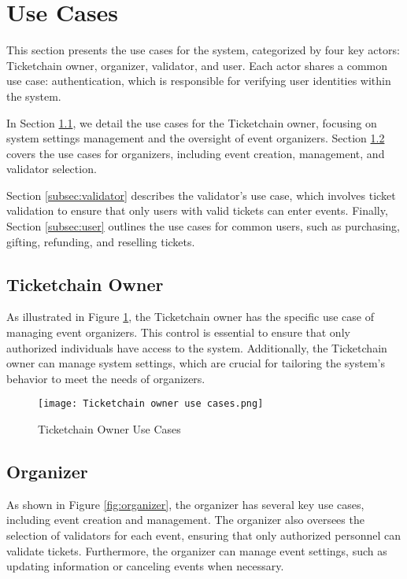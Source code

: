 \section{Use Cases}
\label{sec:use_cases}

This section presents the use cases for the system, categorized by four key
actors: Ticketchain owner, organizer, validator, and user. Each actor shares a
common use case: authentication, which is responsible for verifying user
identities within the system.

In Section \ref{subsec:ticketchain_owner}, we detail the use cases for the
Ticketchain owner, focusing on system settings management and the oversight of
event organizers. Section \ref{subsec:organizer} covers the use cases for
organizers, including event creation, management, and validator selection.

Section \ref{subsec:validator} describes the validator's use case, which
involves ticket validation to ensure that only users with valid tickets can
enter events. Finally, Section \ref{subsec:user} outlines the use cases for
common users, such as purchasing, gifting, refunding, and reselling tickets.

\subsection{Ticketchain Owner}
\label{subsec:ticketchain_owner}

As illustrated in Figure \ref{fig:ticketchain_owner_use_cases}, the Ticketchain
owner has the specific use case of managing event organizers. This control is
essential to ensure that only authorized individuals have access to the system.
Additionally, the Ticketchain owner can manage system settings, which are
crucial for tailoring the system’s behavior to meet the needs of organizers.

\begin{figure}[H]
    \centering
    \texttt{[image: Ticketchain owner use cases.png]}
    \caption{Ticketchain Owner Use Cases}
    \label{fig:ticketchain_owner_use_cases}
\end{figure}

\subsection{Organizer}
\label{subsec:organizer}

As shown in Figure \ref{fig:organizer}, the organizer has several key use
cases, including event creation and management. The organizer also oversees the
selection of validators for each event, ensuring that only authorized personnel
can validate tickets. Furthermore, the organizer can manage event settings,
such as updating information or canceling events when necessary.

